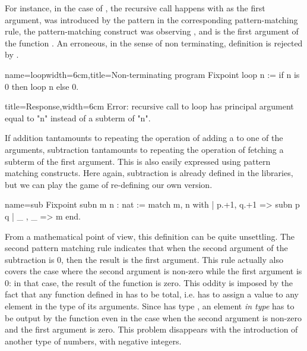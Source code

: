 For instance, in the case of , the recursive call happens
with  as the first argument,  was introduced by the pattern 
in the corresponding pattern-matching rule, the pattern-matching
construct was observing , and  is the first argument of the
function .  An erroneous, in the sense of non terminating,
definition is rejected by \Coq{}.

\begin{coq}{name=loop}{width=6cm,title=Non-terminating program}
Fixpoint loop n :=
 if n is 0 then loop n else 0.
$~$
\end{coq}
\begin{coqout}{}{title=Response,width=6cm}
Error: recursive call to loop has
principal argument equal to  "n"
instead of a subterm of "n".
\end{coqout}

%
%
If addition tantamounts to repeating the operation of adding a 
to one of the arguments, subtraction tantamounts to repeating the
operation of fetching a subterm of the first argument.  This is also
easily expressed using pattern matching constructs.  Here again,
subtraction is already defined in the libraries, but we can play the game
of re-defining our own version.

\begin{coq}{name=sub}{}
Fixpoint subn m n : nat :=
  match m, n with
  | p.+1, q.+1 => subn p q
  | _ , _ => m
  end.
\end{coq}
From a mathematical point of view, this definition can be quite
unsettling.  The second pattern matching rule indicates that when
the second argument of the subtraction is 0, then the result is
the first argument.  This rule actually also covers the case where the
second argument is non-zero while the first argument is 0: in that
case, the result of the function is zero. This oddity is imposed by
the fact that any function defined in \Coq{} has to be total, i.e. has
to assign a value to any element in the type of its arguments. Since
 has type , an element \emph{in type}  has to be
output by the function even in the case when  the second argument is
non-zero and the first argument is zero. This problem disappears with
the introduction of another type of numbers, with negative integers.

